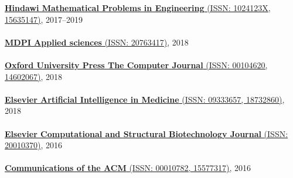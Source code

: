 \href{https://www.hindawi.com/journals/mpe/}{\textbf{Hindawi Mathematical Problems in Engineering} (ISSN: 1024123X, 15635147)}, 2017--2019
\\ \halfblankline \\
\href{http://www.mdpi.com/journal/applsci}{\textbf{MDPI Applied sciences} (ISSN: 20763417)}, 2018
\\ \halfblankline \\
\href{https://academic.oup.com/comjnl}{\textbf{Oxford University Press The Computer Journal} (ISSN: 00104620, 14602067)}, 2018
\\ \halfblankline \\
\href{https://www.journals.elsevier.com/artificial-intelligence-in-medicine/}{\textbf{Elsevier Artificial Intelligence in Medicine} (ISSN: 09333657, 18732860)}, 2018
\\ \halfblankline \\
\href{https://www.journals.elsevier.com/computational-and-structural-biotechnology-journal/}{\textbf{Elsevier Computational and Structural Biotechnology Journal} (ISSN: 20010370)}, 2016
\\ \halfblankline \\
\href{http://cacm.acm.org/}{\textbf{Communications of the ACM} (ISSN: 00010782, 15577317)}, 2016
